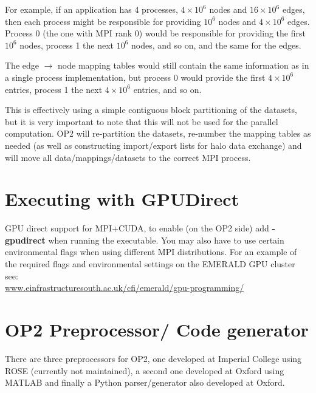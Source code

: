 \documentclass[11pt]{article}
\begin{document}
For example, if an application has 4 processes, $4\!\times\! 10^6$ nodes and
$16 \!\times\! 10^6$ edges, then each process might be responsible for providing
$10^6$ nodes and $4\!\times\! 10^6$ edges. Process 0 (the one with MPI rank 0)
would be responsible for providing the first $10^6$ nodes, process 1 the
next $10^6$ nodes, and so on, and the same for the edges.

The edge $\rightarrow$ node mapping tables would still contain the same
information as in a single process implementation, but process 0 would provide
the first $4\!\times\! 10^6$ entries, process 1 the next $4\!\times\! 10^6$ entries,
and so on.

This is effectively using a simple contiguous block partitioning of the datasets,
but it is very important to note that this will not be used for the parallel
computation.  OP2 will re-partition the datasets,
re-number the mapping tables as needed (as well as constructing import/export
lists for halo data exchange) and will move all data/mappings/datasets to the
correct MPI process.


\newpage

\section{Executing with GPUDirect}

GPU direct support for MPI+CUDA, to enable (on the OP2 side) add \textbf{-gpudirect} when running the executable. You
may also have to use certain environmental flags when using different MPI distributions. For an example of the
required flags and environmental settings on the EMERALD GPU cluster
see: \\
\url{www.einfrastructuresouth.ac.uk/cfi/emerald/gpu-programming/}

\newpage

\section{OP2 Preprocessor/ Code generator}

There are three preprocessors for OP2, one developed at Imperial College using ROSE (currently not maintained),
a second one developed at Oxford using MATLAB and finally a Python parser/generator also developed at Oxford.
\end{document}
